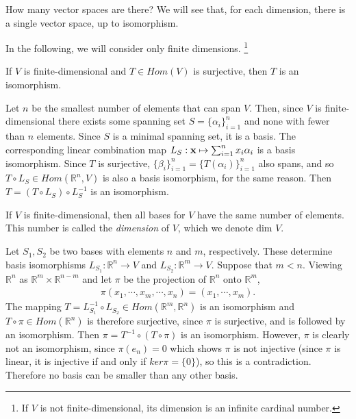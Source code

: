 \documentclass[12pt,letterpaper,reqno]{article}
\numberwithin{equation}{section}
\newcommand{\ti}[1]{\textit{#1}}
\begin{document}
How many vector spaces are there? We will see that, for each dimension, there is a single vector space, up to isomorphism.

In the following, we will consider only finite dimensions. \footnote{If $V$ is not finite-dimensional, its dimension is an infinite cardinal number.}

\begin{lem}\label{lem:a_surjective_map_on_a_finite-dimensional_vector_space_is_an_isomorphism}
If $V$ is finite-dimensional and $T \in Hom(V)$ is surjective, then $T$ is an isomorphism.	
\end{lem}

\begin{pf}
Let $n$ be the smallest number of elements that can span $V$. Then, since $V$ is finite-dimensional there exists some spanning set $S = \{\alpha_i\}_{i=1}^n$ and none with fewer than $n$ elements. Since $S$ is a minimal spanning set, it is a basis. The corresponding linear combination map $L_S:{\bf x} \mapsto \sum_{i=1}^nx_i\alpha_i$ is a basis isomorphism. Since $T$ is surjective, $\{\beta_i\}_{i=1}^n=\{T(\alpha_i)\}_{i=1}^n$ also spans, and so $T \circ L_S \in Hom(\mathbb{R}^n,V)$ is also a basis isomorphism, for the same reason. Then $T=(T\circ L_S)\circ L_S^{-1}$ is an isomorphism.	
\end{pf}

\begin{thm}
If $V$ is finite-dimensional, then all bases for $V$ have the same number of elements. This number is called the \ti{dimension} of $V$, which we denote $\text{dim } V$.	
\end{thm}

\begin{pf}
Let $S_1,S_2$ be two bases with elements $n$ and $m$, respectively. These determine basis isomorphisms $L_{S_1}:\mathbb{R}^n \to V$ and $L_{S_2}:\mathbb{R}^m \to V$. Suppose that $m<n$. Viewing $\mathbb{R}^n$ as $\mathbb{R}^m \times \mathbb{R}^{n-m}$ and let $\pi$ be the projection of $\mathbb{R}^n$ onto $\mathbb{R}^m$,
\begin{align*}
	\pi(x_1,\cdots,x_m,\cdots,x_n)=(x_1,\cdots,x_m).
\end{align*}
The mapping $T=L_{S_1}^{-1} \circ L_{S_2} \in Hom(\mathbb{R}^m,\mathbb{R}^n)$ is an isomorphism and $T \circ \pi \in Hom(\mathbb{R}^n)$ is therefore surjective, since $\pi$ is surjective, and is followed by an isomorphism.  Then $\pi=T^{-1} \circ (T \circ \pi)$ is an isomorphism. However, $\pi$ is clearly not an isomorphism, since $\pi(e_n)=0$ which shows $\pi$ is not injective (since $\pi$ is linear, it is injective if and only if $ker \pi =\{0\}$), so this is a contradiction. Therefore no basis can be smaller than any other basis.	
\end{pf}
\end{document}
